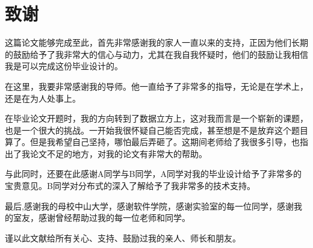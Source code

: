 
\chapter{致谢}

这篇论文能够完成至此，首先非常感谢我的家人一直以来的支持，正因为他们长期的鼓励给予了我非常大的信心与动力，尤其在我自我怀疑时，他们的鼓励让我相信我是可以完成这份毕业设计的。

在这里，我要非常感谢我的导师。他一直给予了非常多的指导，无论是在学术上，还是在为人处事上。


在毕业论文开题时，我的方向转到了数据立方上，这对我而言是一个崭新的课题，也是一个很大的挑战。一开始我很怀疑自己能否完成，甚至想是不是放弃这个题目算了。但是我希望自己坚持，哪怕最后弄砸了。这期间老师给了我很多引导，也指出了我论文不足的地方，对我的论文有非常大的帮助。

与此同时，还要在此感谢A同学与B同学，A同学对我的毕业设计给予了非常多的宝贵意见。B同学对分布式的深入了解给予了我非常多的技术支持。

最后,感谢我的母校中山大学，感谢软件学院，感谢实验室的每一位同学，感谢我的室友，感谢曾经帮助过我的每一位老师和同学。

谨以此文献给所有关心、支持、鼓励过我的亲人、师长和朋友。\nopagebreak

